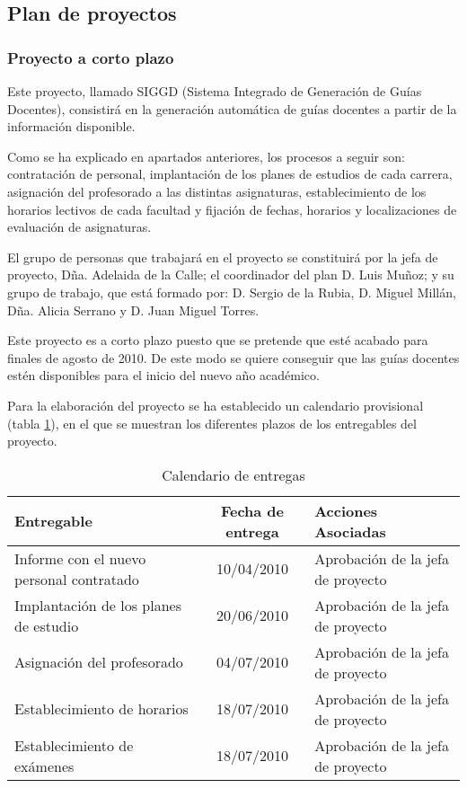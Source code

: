 \documentclass[11pt,a4paper,spanish,twoside]{book}
\begin{document}
\subsection{Plan de proyectos} \label{ss:8.1.1}
\subsubsection{Proyecto a corto plazo}
Este proyecto, llamado SIGGD (Sistema Integrado de Generación de Guías 
Docentes), consistirá en la generación automática de guías docentes a partir de
la información disponible.

Como se ha explicado en apartados anteriores, los procesos a seguir son:
contratación de personal, implantación de los planes de estudios de cada 
carrera, asignación del profesorado a las distintas asignaturas, 
establecimiento de los horarios lectivos de cada facultad y fijación de 
fechas, horarios y localizaciones de evaluación de asignaturas.

El grupo de personas que trabajará en el proyecto se constituirá por la
jefa de proyecto, Dña. Adelaida de la Calle; el coordinador del plan D. Luis
Muñoz; y su grupo de trabajo, que está formado por: D. Sergio de la Rubia,
D. Miguel Millán, Dña. Alicia Serrano y D. Juan Miguel Torres.

Este proyecto es a corto plazo puesto que se pretende que esté acabado para 
finales de agosto de 2010. De este modo se quiere conseguir que las guías 
docentes estén disponibles para el inicio del nuevo año académico.

Para la elaboración del proyecto se ha establecido un calendario provisional
(tabla \ref{tab:cal}), en el que se muestran los diferentes plazos de los 
entregables del proyecto.

\begin{table}[!h]
\centering
  \begin{tabular}{p{4cm}cp{3.7cm}}
    \textbf{Entregable} & \textbf{Fecha de entrega} &
    \textbf{Acciones Asociadas} \\
    \hline \hline
    Informe con el nuevo personal contratado & 10/04/2010 & Aprobación de la 
    jefa de proyecto\\ \hline
    Implantación de los planes de estudio & 20/06/2010 & Aprobación de la jefa 
    de proyecto\\ \hline
    Asignación del profesorado & 04/07/2010 & Aprobación de la jefa de 
    proyecto\\ \hline
    Establecimiento de horarios & 18/07/2010 & Aprobación de la jefa de 
    proyecto\\ \hline
    Establecimiento de exámenes & 18/07/2010 & Aprobación de la jefa de 
    proyecto\\ \hline
  \end{tabular}
\caption{Calendario de entregas}\label{tab:cal}
\end{table}
\end{document}
